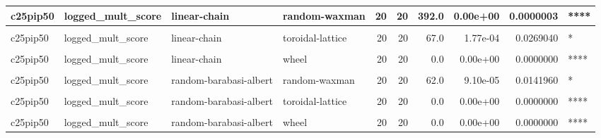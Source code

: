\documentclass[
]{book}
\begin{document}
\begin{table}
\begin{tabular}{l|l|l|l|r|r|r|r|r|l}
\hline
c25pip50 & logged\_mult\_score & linear-chain & random-waxman & 20 & 20 & 392.0 & 0.00e+00 & 0.0000003 & ****\\
\hline
\cellcolor{gray!6}{c25pip50} & \cellcolor{gray!6}{logged\_mult\_score} & \cellcolor{gray!6}{linear-chain} & \cellcolor{gray!6}{star} & \cellcolor{gray!6}{20} & \cellcolor{gray!6}{20} & \cellcolor{gray!6}{0.0} & \cellcolor{gray!6}{0.00e+00} & \cellcolor{gray!6}{0.0000000} & \cellcolor{gray!6}{****}\\
\hline
c25pip50 & logged\_mult\_score & linear-chain & toroidal-lattice & 20 & 20 & 67.0 & 1.77e-04 & 0.0269040 & *\\
\hline
\cellcolor{gray!6}{c25pip50} & \cellcolor{gray!6}{logged\_mult\_score} & \cellcolor{gray!6}{linear-chain} & \cellcolor{gray!6}{well-mixed} & \cellcolor{gray!6}{20} & \cellcolor{gray!6}{20} & \cellcolor{gray!6}{32.0} & \cellcolor{gray!6}{6.00e-07} & \cellcolor{gray!6}{0.0001329} & \cellcolor{gray!6}{***}\\
\hline
c25pip50 & logged\_mult\_score & linear-chain & wheel & 20 & 20 & 0.0 & 0.00e+00 & 0.0000000 & ****\\
\hline
\cellcolor{gray!6}{c25pip50} & \cellcolor{gray!6}{logged\_mult\_score} & \cellcolor{gray!6}{linear-chain} & \cellcolor{gray!6}{windmill} & \cellcolor{gray!6}{20} & \cellcolor{gray!6}{20} & \cellcolor{gray!6}{202.0} & \cellcolor{gray!6}{9.68e-01} & \cellcolor{gray!6}{1.0000000} & \cellcolor{gray!6}{ns}\\
\hline
c25pip50 & logged\_mult\_score & random-barabasi-albert & random-waxman & 20 & 20 & 62.0 & 9.10e-05 & 0.0141960 & *\\
\hline
\cellcolor{gray!6}{c25pip50} & \cellcolor{gray!6}{logged\_mult\_score} & \cellcolor{gray!6}{random-barabasi-albert} & \cellcolor{gray!6}{star} & \cellcolor{gray!6}{20} & \cellcolor{gray!6}{20} & \cellcolor{gray!6}{0.0} & \cellcolor{gray!6}{0.00e+00} & \cellcolor{gray!6}{0.0000000} & \cellcolor{gray!6}{****}\\
\hline
c25pip50 & logged\_mult\_score & random-barabasi-albert & toroidal-lattice & 20 & 20 & 0.0 & 0.00e+00 & 0.0000000 & ****\\
\hline
\cellcolor{gray!6}{c25pip50} & \cellcolor{gray!6}{logged\_mult\_score} & \cellcolor{gray!6}{random-barabasi-albert} & \cellcolor{gray!6}{well-mixed} & \cellcolor{gray!6}{20} & \cellcolor{gray!6}{20} & \cellcolor{gray!6}{0.0} & \cellcolor{gray!6}{0.00e+00} & \cellcolor{gray!6}{0.0000000} & \cellcolor{gray!6}{****}\\
\hline
c25pip50 & logged\_mult\_score & random-barabasi-albert & wheel & 20 & 20 & 0.0 & 0.00e+00 & 0.0000000 & ****\\

\end{tabular}
\end{table}
\end{document}
